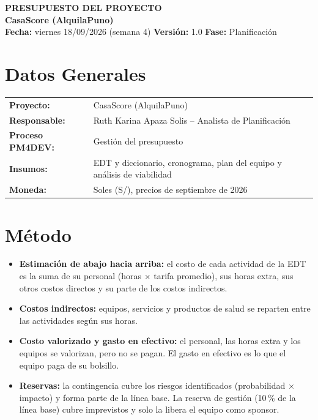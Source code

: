 \documentclass[11pt,a4paper]{article}
\begin{document}
\begin{center}
    {\Large \textbf{\textcolor{AzulUNA}{PRESUPUESTO DEL PROYECTO}}}\\[3pt]
    {\normalsize \textbf{CasaScore (AlquilaPuno)}}\\[4pt]
    \footnotesize \textbf{Fecha:} viernes 18/09/2026 (semana 4) \quad \textbar\quad \textbf{Versión:} 1.0 \quad \textbar\quad \textbf{Fase:} Planificación
\end{center}

\vspace{0.1cm}

\section{Datos Generales}
\noindent\begin{tabularx}{\textwidth}{@{}P{4.2cm} L@{}}
\toprule
\textbf{Proyecto:} & CasaScore (AlquilaPuno) \\
\textbf{Responsable:} & Ruth Karina Apaza Solis -- Analista de Planificación \\
\textbf{Proceso PM4DEV:} & Gestión del presupuesto \\
\textbf{Insumos:} & EDT y diccionario, cronograma, plan del equipo y análisis de viabilidad \\
\textbf{Moneda:} & Soles (S/), precios de septiembre de 2026 \\
\bottomrule
\end{tabularx}

\section{Método}
\begin{itemize}[leftmargin=*]
    \item \textbf{Estimación de abajo hacia arriba:} el costo de cada actividad de la EDT es la suma de su personal (horas $\times$ tarifa promedio), sus horas extra, sus otros costos directos y su parte de los costos indirectos.
    \item \textbf{Costos indirectos:} equipos, servicios y productos de salud se reparten entre las actividades según sus horas.
    \item \textbf{Costo valorizado y gasto en efectivo:} el personal, las horas extra y los equipos se valorizan, pero no se pagan. El gasto en efectivo es lo que el equipo paga de su bolsillo.
    \item \textbf{Reservas:} la contingencia cubre los riesgos identificados (probabilidad $\times$ impacto) y forma parte de la línea base. La reserva de gestión (10\,\% de la línea base) cubre imprevistos y solo la libera el equipo como sponsor.
\end{itemize}
\end{document}
